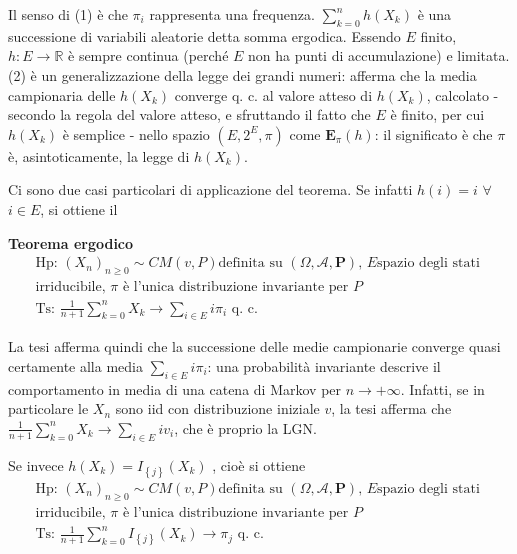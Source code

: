 \documentclass{article}
\begin{document}
Il senso di (1) \`{e} che $\pi _{i}$ rappresenta una frequenza. $%
\sum_{k=0}^{n}h\left( X_{k}\right) $ \`{e} una successione di variabili
aleatorie detta somma ergodica. Essendo $E$ finito, 
$h:E\rightarrow 
\mathbb{R}
$ \`{e} sempre continua (perch\'{e} $E$ non ha punti di accumulazione) e
limitata. (2) \`{e} un generalizzazione della legge dei grandi numeri:
afferma che la media campionaria delle $h\left( X_{k}\right) $ converge q.
c. al valore atteso di $h\left( X_{k}\right) $, calcolato - secondo la
regola del valore atteso, e sfruttando il fatto che $E$ \`{e} finito, per
cui $h\left( X_{k}\right) $ \`{e} semplice - nello spazio $\left(
E,2^{E},\pi \right) $ come $\mathbf{E}_{\pi }\left( h\right) $: il
significato \`{e} che $\pi $ \`{e}, asintoticamente, la legge di $h\left(
X_{k}\right) $.

Ci sono due casi particolari di applicazione del teorema. Se infatti $%
h\left( i\right) =i$ $\forall $ $i\in E$, si ottiene il

\textbf{Teorema ergodico}%
\begin{gather*}
\text{Hp: }\left( X_{n}\right) _{n\geq 0}\sim CM\left( v,P\right) \text{
definita su }\left( \Omega ,\mathcal{A},\mathbf{P}\right) \text{, }E\text{
spazio degli stati } \\
\text{irriducibile, }\pi \text{ \`{e} l'unica distribuzione invariante per }P
\\
\text{Ts: }\frac{1}{n+1}\sum_{k=0}^{n}X_{k}\rightarrow \sum_{i\in E}i\pi _{i}%
\text{ q. c.}
\end{gather*}

La tesi afferma quindi che la successione delle medie campionarie converge
quasi certamente alla media $\sum_{i\in E}i\pi _{i}$: una probabilit\`{a}
invariante descrive il comportamento in media di una catena di Markov per $%
n\rightarrow +\infty $. Infatti, se in particolare le $X_{n}$ sono iid con
distribuzione iniziale $v$, la tesi afferma che $\frac{1}{n+1}%
\sum_{k=0}^{n}X_{k}\rightarrow \sum_{i\in E}iv_{i}$, che \`{e} proprio la
LGN.

Se invece $h\left( X_{k}\right) =I_{\left\{ j\right\} }\left( X_{k}\right) $%
, cio\`{e} si ottiene 
\begin{gather*}
\text{Hp: }\left( X_{n}\right) _{n\geq 0}\sim CM\left( v,P\right) \text{
definita su }\left( \Omega ,\mathcal{A},\mathbf{P}\right) \text{, }E\text{
spazio degli stati } \\
\text{irriducibile, }\pi \text{ \`{e} l'unica distribuzione invariante per }P
\\
\text{Ts: }\frac{1}{n+1}\sum_{k=0}^{n}I_{\left\{ j\right\} }\left(
X_{k}\right) \rightarrow \pi _{j}\text{ q. c.}
\end{gather*}
\end{document}
